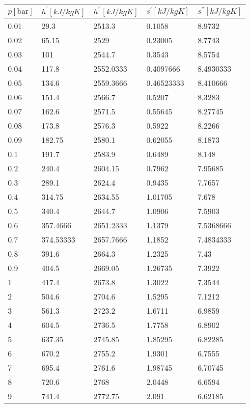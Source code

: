 \documentclass[twocolumn]{article}
\begin{document}
\begin{tabular}{l|l|l|l|l}
	$p [\text{bar}] $ & $h^{'} [kJ/kg K]$ & $h^{''} [kJ/kg K]$ & $s^{'} [kJ/kg K] $ & $s^{''} [kJ/kg K]$ \\ \hline
0.01	&	29.3	&	2513.3	&	0.1058	&	8.9732 \\ \hline
0.02	&	65.15	&	2529	&	0.23005	&	8.7743 \\ \hline
0.03	&	101	&	2544.7	&	0.3543	&	8.5754 \\ \hline
0.04	&	117.8	&	2552.0333	&	0.4097666	&	8.4930333 \\ \hline
0.05	&	134.6	&	2559.3666	&	0.46523333	&	8.410666 \\ \hline
0.06	&	151.4	&	2566.7	&	0.5207	&	8.3283 \\ \hline
0.07	&	162.6	&	2571.5	&	0.55645	&	8.27745 \\ \hline
0.08	&	173.8	&	2576.3	&	0.5922	&	8.2266 \\ \hline
0.09	&	182.75	&	2580.1	&	0.62055	&	8.1873 \\ \hline
0.1	&	191.7	&	2583.9	&	0.6489	&	8.148 \\ \hline
0.2	&	240.4	&	2604.15	&	0.7962	&	7.95685 \\ \hline
0.3	&	289.1	&	2624.4	&	0.9435	&	7.7657 \\ \hline
0.4	&	314.75	&	2634.55	&	1.01705	&	7.678 \\ \hline
0.5	&	340.4	&	2644.7	&	1.0906	&	7.5903 \\ \hline
0.6	&	357.4666	&	2651.2333	&	1.1379	&	7.5368666 \\ \hline
0.7	&	374.53333	&	2657.7666	&	1.1852	&	7.4834333 \\ \hline
0.8	&	391.6	&	2664.3	&	1.2325	&	7.43 \\ \hline
0.9	&	404.5	&	2669.05	&	1.26735	&	7.3922 \\ \hline
1	&	417.4	&	2673.8	&	1.3022	&	7.3544 \\ \hline
2	&	504.6	&	2704.6	&	1.5295	&	7.1212 \\ \hline
3	&	561.3	&	2723.2	&	1.6711	&	6.9859 \\ \hline
4	&	604.5	&	2736.5	&	1.7758	&	6.8902 \\ \hline
5	&	637.35	&	2745.85	&	1.85295	&	6.82285 \\ \hline
6	&	670.2	&	2755.2	&	1.9301	&	6.7555 \\ \hline
7	&	695.4	&	2761.6	&	1.98745	&	6.70745 \\ \hline
8	&	720.6	&	2768	&	2.0448	&	6.6594 \\ \hline
9	&	741.4	&	2772.75	&	2.091	&	6.62185 \\ \hline

\end{tabular}
\end{document}
